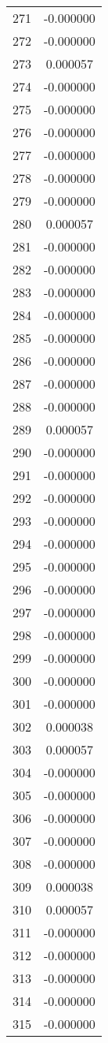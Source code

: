 \documentclass[12pt]{article}
\begin{document}
\begin{longtable}{@{}cc@{}}
271 & -0.000000 \\
272 & -0.000000 \\
273 & 0.000057 \\
274 & -0.000000 \\
275 & -0.000000 \\
276 & -0.000000 \\
277 & -0.000000 \\
278 & -0.000000 \\
279 & -0.000000 \\
280 & 0.000057 \\
281 & -0.000000 \\
282 & -0.000000 \\
283 & -0.000000 \\
284 & -0.000000 \\
285 & -0.000000 \\
286 & -0.000000 \\
287 & -0.000000 \\
288 & -0.000000 \\
289 & 0.000057 \\
290 & -0.000000 \\
291 & -0.000000 \\
292 & -0.000000 \\
293 & -0.000000 \\
294 & -0.000000 \\
295 & -0.000000 \\
296 & -0.000000 \\
297 & -0.000000 \\
298 & -0.000000 \\
299 & -0.000000 \\
300 & -0.000000 \\
301 & -0.000000 \\
302 & 0.000038 \\
303 & 0.000057 \\
304 & -0.000000 \\
305 & -0.000000 \\
306 & -0.000000 \\
307 & -0.000000 \\
308 & -0.000000 \\
309 & 0.000038 \\
310 & 0.000057 \\
311 & -0.000000 \\
312 & -0.000000 \\
313 & -0.000000 \\
314 & -0.000000 \\
315 & -0.000000 \\

\end{longtable}
\end{document}
